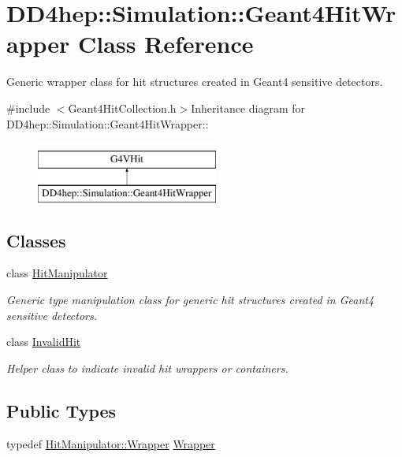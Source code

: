 \hypertarget{class_d_d4hep_1_1_simulation_1_1_geant4_hit_wrapper}{
\section{DD4hep::Simulation::Geant4HitWrapper Class Reference}
\label{class_d_d4hep_1_1_simulation_1_1_geant4_hit_wrapper}
}


Generic wrapper class for hit structures created in Geant4 sensitive detectors.  


{\ttfamily \#include $<$Geant4HitCollection.h$>$}Inheritance diagram for DD4hep::Simulation::Geant4HitWrapper::\begin{figure}[H]
\begin{center}
\leavevmode
\includegraphics[height=2cm]{class_d_d4hep_1_1_simulation_1_1_geant4_hit_wrapper}
\end{center}
\end{figure}
\subsection*{Classes}
\begin{DoxyCompactItemize}
\item 
class \hyperlink{class_d_d4hep_1_1_simulation_1_1_geant4_hit_wrapper_1_1_hit_manipulator}{HitManipulator}
\begin{DoxyCompactList}\small\item\em Generic type manipulation class for generic hit structures created in Geant4 sensitive detectors. \item\end{DoxyCompactList}\item 
class \hyperlink{class_d_d4hep_1_1_simulation_1_1_geant4_hit_wrapper_1_1_invalid_hit}{InvalidHit}
\begin{DoxyCompactList}\small\item\em Helper class to indicate invalid hit wrappers or containers. \item\end{DoxyCompactList}\end{DoxyCompactItemize}
\subsection*{Public Types}
\begin{DoxyCompactItemize}
\item 
typedef \hyperlink{class_d_d4hep_1_1_simulation_1_1_geant4_hit_wrapper_1_1_hit_manipulator_a4bb62cc7e4979a8d0aea281477a4e38e}{HitManipulator::Wrapper} \hyperlink{class_d_d4hep_1_1_simulation_1_1_geant4_hit_wrapper_a4779e35eba7d553e0f2d497c49a42ec6}{Wrapper}
\end{DoxyCompactItemize}
